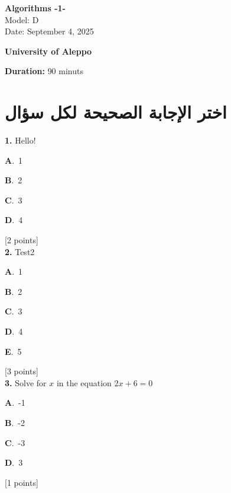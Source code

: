 \documentclass[12pt]{article}
\newcommand{\choice}[3]{%
  \noindent\textbf{#1}.~#2\hfill#3\par\vspace{0.25em}
}
\begin{document}
\begin{flushright}
{\Large \textbf{{\textenglish{Algorithms -1-}}}}\\[0.25em]
{\normalsize \textenglish{Model: }{\textenglish{D}}}\\[0.1em]
{\normalsize \textenglish{Date: }{\textenglish{September 4, 2025}}}
\end{flushright}

\vspace{0.6cm}

\noindent
\begin{minipage}[t]{0.65\textwidth}
  \raggedright
  \textbf{{\textenglish{University of Aleppo}}}\\[0.3em]
\end{minipage}\hfill
\begin{minipage}[t]{0.3\textwidth}
  \raggedleft
  \textenglish{\textbf{Duration: }}{\textenglish{90 minuts}}
\end{minipage}

\vspace{0.9cm}

\section*{اختر الإجابة الصحيحة لكل سؤال}

\noindent \textbf{\textenglish{1.}} {\textenglish{Hello!}}

\noindent\choice{A}{{\textenglish{1}}}{}
\noindent\choice{B}{{\textenglish{2}}}{}
\noindent\choice{C}{{\textenglish{3}}}{}
\noindent\choice{D}{{\textenglish{4}}}{}
\hfill {\textenglish{[2 points]}}\\[0.5em]

\noindent \textbf{\textenglish{2.}} {\textenglish{Test2}}

\noindent\choice{A}{{\textenglish{1}}}{}
\noindent\choice{B}{{\textenglish{2}}}{}
\noindent\choice{C}{{\textenglish{3}}}{}
\noindent\choice{D}{{\textenglish{4}}}{}
\noindent\choice{E}{{\textenglish{5}}}{}
\hfill {\textenglish{[3 points]}}\\[0.5em]

\noindent \textbf{\textenglish{3.}} {\textenglish{Solve for }}\(x \){\textenglish{ in the equation }}\(2x+6 = 0 \)

\noindent\choice{A}{{\textenglish{-1}}}{}
\noindent\choice{B}{{\textenglish{-2}}}{}
\noindent\choice{C}{{\textenglish{-3}}}{}
\noindent\choice{D}{{\textenglish{3}}}{}
\hfill {\textenglish{[1 points]}}\\[0.5em]
\end{document}
